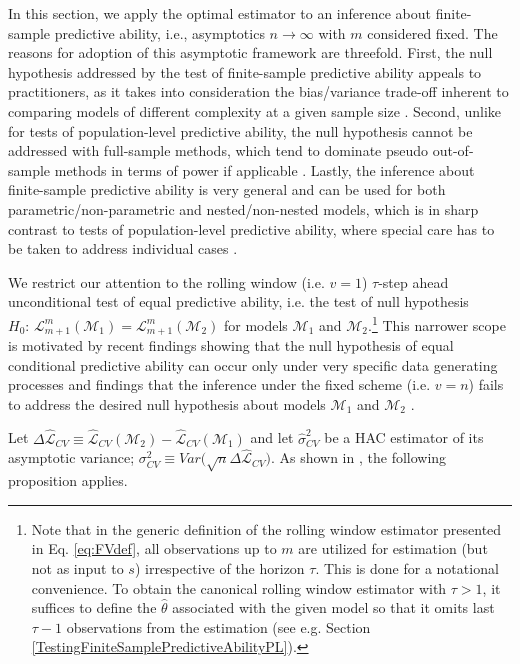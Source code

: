 \documentclass[11pt,dvipsnames]{article}
\begin{document}
In this section, we apply the optimal estimator to an inference about finite-sample predictive ability, i.e., asymptotics $ n \rightarrow \infty $ with $ m $ considered fixed. The reasons for adoption of this asymptotic framework are threefold. First, the null hypothesis addressed by the test of finite-sample predictive ability appeals to practitioners, as it takes into consideration the bias/variance trade-off inherent to comparing models of different complexity at a given sample size \citep{clarkChapter20Advances2013}. Second, unlike for tests of population-level predictive ability, the null hypothesis cannot be addressed with full-sample methods, which tend to dominate pseudo out-of-sample methods in terms of power if applicable \citep{dieboldComparingPredictiveAccuracy2015}. Lastly, the inference about finite-sample predictive ability is very general and can be used for both parametric/non-parametric and nested/non-nested models, which is in sharp contrast to tests of population-level predictive ability, where special care has to be taken to address individual cases \citep{westChapterForecastEvaluation2006}.

We restrict our attention to the rolling window (i.e. $v=1 $) $ \tau $-step ahead unconditional test of equal predictive ability, i.e. the test of null hypothesis $H_{0}:\, \mathcal{L}_{m+1}^{m}(\mathcal{M}_{1})=\mathcal{L}_{m+1}^{m}(\mathcal{M}_{2}) $ for models $ \mathcal{M}_{1} $ and $ \mathcal{M}_{2} $.\footnote{Note that in the generic definition of the rolling window estimator presented in Eq. \ref{eq:FVdef}, all observations up to $ m $ are utilized for estimation (but not as input to $ s $) irrespective of the horizon $ \tau $. This is done for a notational convenience. To obtain the canonical rolling window estimator with $ \tau>1 $, it suffices to define the $ \widehat{\theta} $  associated with the given model so that it omits last $ \tau - 1 $ observations from the estimation (see e.g. Section \ref{TestingFiniteSamplePredictiveAbilityPL}).} This narrower scope is motivated by recent findings showing that the null hypothesis of equal conditional predictive ability can occur only under very specific data generating processes \citep{zhuCanTwoForecasts2020} and findings that the inference under the fixed scheme (i.e. $ v=n $) fails to address the desired null hypothesis about models  $ \mathcal{M}_{1} $ and  $ \mathcal{M}_{2} $ \citep{mccrackenDivergingTestsEqual2020}.

Let $ \Delta \widehat{\mathcal{L}}_{CV} \equiv \widehat{\mathcal{L}}_{CV}(\mathcal{M}_{2})-\widehat{\mathcal{L}}_{CV}(\mathcal{M}_{1}) $ and let $ \widehat{\sigma}_{CV}^{2} $ be a HAC estimator of its asymptotic variance; $ \sigma_{CV}^{2} \equiv Var\big( \sqrt{n} \Delta \widehat{\mathcal{L}}_{CV} \big) $. As shown in \citet{giacominiTestsConditionalPredictive2006}, the following proposition applies.
\end{document}
